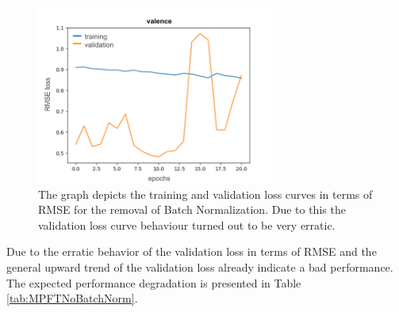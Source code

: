 \begin{figure}[htbp]
  \begin{center}
  \includegraphics[angle=0, width=0.7\textwidth]{Figures/Plot_AblationStudy_BatchNorm.png}
  \caption[Ablation study: BatchNormalization loss curve]{The graph depicts the training and validation loss curves in terms of RMSE for the removal of Batch Normalization. Due to this the validation loss curve behaviour turned out to be very erratic.}
  \label{fig:AblationNoBatchNorm}
  \end{center}
\end{figure}         

\noindent Due to the erratic behavior of the validation loss in terms of RMSE and the general upward trend of the validation loss already indicate a bad performance. The expected performance degradation is presented in Table \ref{tab:MPFTNoBatchNorm}. \newline


